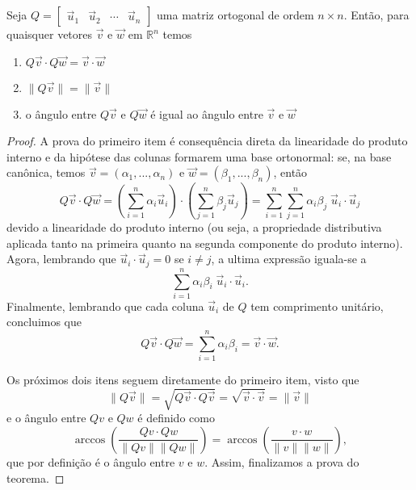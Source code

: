 \documentclass[../livro.tex]{subfiles}  %
\begin{document}
\begin{theorem}
	Seja $Q= \begin{bmatrix}
	\vec{u}_1 & \vec{u}_2 & \cdots & \vec{u}_n
	\end{bmatrix}$ uma matriz ortogonal de ordem $n \times n$. Então, para quaisquer vetores $\vec{v}$ e $\vec{w}$ em $\mathbb{R}^n$ temos
	\begin{enumerate}[$(i)$]
		\item $Q\vec{v} \cdot Q\vec{w} = \vec{v} \cdot  \vec{w}$
		\item  $\| Q\vec{v} \| = \| \vec{v} \|$
		\item  o ângulo entre $Q\vec{v}$ e $Q\vec{w}$ é igual ao  ângulo entre $\vec{v}$ e $\vec{w}$
		\end{enumerate}
\end{theorem}

\begin{proof}
A prova do primeiro item é consequência direta da linearidade do produto interno e da hipótese das colunas formarem uma base ortonormal: se, na base canônica, temos $\vec{v} = (\alpha_1,..., \alpha_n)$ e $\vec{w} = (\beta_1, ..., \beta_n)$, então
\begin{equation}Q\vec{v} \cdot Q\vec{w} = \left( \sum_{i=1}^n \alpha_i \vec{u}_i \right) \cdot \left(   \sum_{j=1}^n \beta_j \vec{u}_j \right) =  \sum_{i=1}^n \sum_{j=1}^n \alpha_i \beta_j \;\vec{u}_i \cdot \vec{u}_j\end{equation} 
devido a linearidade do produto interno (ou seja, a propriedade distributiva aplicada tanto na primeira quanto na segunda componente do produto interno). Agora, lembrando que $\vec{u}_i \cdot \vec{u}_j=0$ se $i \neq j$, a ultima expressão iguala-se a 
\begin{equation} \sum_{i=1}^n \alpha_i \beta_i \; \vec{u}_i \cdot \vec{u}_i.\end{equation}
Finalmente, lembrando que cada coluna $\vec{u}_i$ de $Q$ tem comprimento unitário, concluimos que
\begin{equation}Q\vec{v} \cdot Q\vec{w} = \sum_{i=1}^n \alpha_i \beta_i = \vec{v} \cdot \vec{w}.\end{equation}
 
 
 Os próximos dois itens seguem diretamente do primeiro item, visto que 
\begin{equation}\| Q \vec{v} \| = \sqrt{Q\vec{v} \cdot Q\vec{v}} = \sqrt{\vec{v} \cdot \vec{v}} =  \| \vec{v} \| \end{equation} 
e 
o ângulo entre $Qv$ e $Qw$ é definido como 
\begin{equation}
\arccos\left(\frac{Qv \cdot Qw	}{\|Qv\| \|Qw\|} \right)
=\arccos\left(\frac{v \cdot w	}{\|v\| \|w\|} \right),\end{equation} 
que por definição é o ângulo  entre $v$ e $w$. 
Assim, finalizamos a prova do teorema. 
\end{proof}
 
\end{document}

